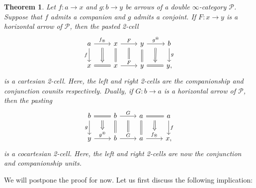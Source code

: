 \documentclass[a4paper, 11pt]{amsart}
\newtheorem{theorem}{Theorem}
\numberwithin{theorem}{section}
\theoremstyle{definition}
\renewcommand{\P}{\mathscr{P}}
\begin{document}
\begin{theorem}\label{th.comp-conj-cart}
	Let $f : a \rightarrow x$ and $g : b \rightarrow y$ be arrows of a double $\infty$-category $\P$. Suppose that 
	$f$ admits a companion and $g$ admits a conjoint. If $F : x\rightarrow y$ is a horizontal arrow 
	of $\P$, then the pasted 2-cell
	\[
		\begin{tikzcd}
			a \arrow[r, "{f_\circledast}"name=f1]\arrow[d,"f"'] & x \arrow[r,	"F"name=f2]\arrow[d,equal] & y \arrow[r, "{g^\circledast}"name=f3] \arrow[d, equal] & b\arrow[d, "g"] \\
			x \arrow[r, equal, ""name=t1] & x \arrow[r, "F"name=t2] & y \arrow[r,equal, ""name=t3] & y,
			\arrow[from=f1, to=t1, Rightarrow, shorten <= 6pt]
			\arrow[from=f2, to=t2, equal, shorten <= 6pt]
			\arrow[from=f3, to=t3, Rightarrow, shorten <= 6pt]
		\end{tikzcd}
	\]
	is a cartesian 2-cell. Here, the left and right 2-cells are the companionship and conjunction counits respectively.
	Dually, if $G : b\rightarrow a$ is a horizontal arrow of $\P$, then the pasting
	\[
		\begin{tikzcd}
			b \arrow[r, equal, ""name=f1]\arrow[d,"g"'] & b\arrow[r,	"G"name=f2]\arrow[d,equal] & a \arrow[r, equal, ""name=f3] \arrow[d, equal] & a\arrow[d, "f"] \\
			y \arrow[r, "g^\circledast"name=t1] & b \arrow[r, "G"name=t2] & a \arrow[r,"f_\circledast"name=t3] & x,
			\arrow[from=f1, to=t1, Rightarrow, shorten <= 6pt]
			\arrow[from=f2, to=t2, equal, shorten <= 6pt]
			\arrow[from=f3, to=t3, Rightarrow, shorten <= 6pt]
		\end{tikzcd}
	\]
	is a cocartesian 2-cell. Here, the left and right 2-cells are now the conjunction and companionship units.
\end{theorem}

We will 
postpone the proof for now. Let us first discuss the following implication:
\end{document}
